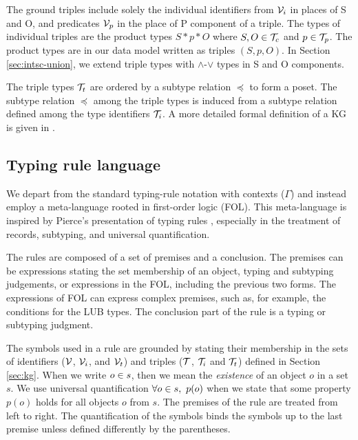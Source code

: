 \documentclass[runningheads]{llncs}
\newcommand{\V}{{\cal V}}
\newcommand{\T}{{\cal T}}
\begin{document}
The ground triples include solely the individual identifiers from
$\V_i$ in places of S and O, and predicates $\V_p$ in the place of P
component of a triple. The types of individual triples are the product
types $S*p*O$ where $S,O\in\T_c$ and $p\in\T_p$. The product types are
in our data model written as triples $(S,p,O)$. In Section
\ref{sec:intsc-union}, we extend triple types with $\land$-$\lor$
types in S and O components.

The triple types $\T_t$ are ordered by a subtype relation $\preceq$ to
form a poset. The subtype relation $\preceq$ among the triple types is
induced from a subtype relation defined among the type identifiers
$\T_i$. A more detailed formal definition of a KG is given in
\cite{Savnik2025}.




\subsection{Typing rule language}

We depart from the standard typing-rule notation with contexts
($\Gamma$) \cite{Pierce2002,Hindley1997} and instead employ a
meta-language rooted in first-order logic (FOL). This meta-language is
inspired by Pierce’s presentation of typing rules \cite{Pierce2002},
especially in the treatment of records, subtyping, and universal
quantification.

The rules are composed of a set of premises and a conclusion. The
premises can be expressions stating the set membership of an object,
typing and subtyping judgements, or expressions in the FOL, including
the previous two forms. The expressions of FOL can express complex
premises, such as, for example, the conditions for the LUB types. The
conclusion part of the rule is a typing or subtyping judgment.

The symbols used in a rule are grounded by stating their membership in
the sets of identifiers ($\V$, $\V_i$, and $\V_t$) and triples ($\T$,
$\T_i$ and $\T_t$) defined in Section \ref{sec:kg}. When we write
$o\in\/s$, then we mean the \emph{existence} of an object $o$ in a set
$s$. We use universal quantification $\forall\/o\in\/s,\ p(o)$ when we
state that some property $p(o)$ holds for all objects $o$ from
$s$. The premises of the rule are treated from left to right. The
quantification of the symbols binds the symbols up to the last premise
unless defined differently by the parentheses.
\end{document}
